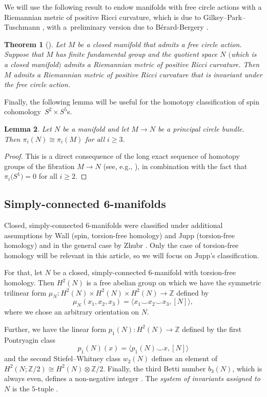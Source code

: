 \documentclass[10pt,a4paper]{amsart}
\numberwithin{equation}{section}
\newtheorem{Theorem}{Theorem}[section]
\newtheorem{Lemma}[Theorem]{Lemma}
\theoremstyle{definition}
\numberwithin{table}{section}
\newcommand{\Z}{\mathbb{Z}}
\begin{document}
We will use the following result to endow manifolds with free circle actions with a Riemannian metric of positive Ricci curvature, which is due to Gilkey--Park--Tuschmann \cite{GPT98}, with a~preliminary version due to B\'erard-Bergery \cite{BB78}.
\begin{Theorem}[{\cite{BB78,GPT98}}]\label{T:Ric>0_bdl}
	Let $M$ be a closed manifold that admits a free circle action. Suppose that $M$ has finite fundamental group and the quotient space $N$ $($which is a closed manifold$)$ admits a Riemannian metric of positive Ricci curvature. Then $M$ admits a Riemannian metric of positive Ricci curvature that is invariant under the free circle action.
\end{Theorem}

Finally, the following lemma will be useful for the homotopy classification of spin cohomology~${S^2\times S^5}$s.
\begin{Lemma}\label{L:princ_circ_hom}
	Let $N$ be a manifold and let $M\to N$ be a principal circle bundle. Then $\pi_i(N)\cong\pi_i(M)$ for all $i\geq 3$.
\end{Lemma}
\begin{proof}
	This is a direct consequence of the long exact sequence of homotopy groups of the fibration $M\to N$ (see, e.g., \cite[Corollary 6.44]{DK01}), in combination with the fact that $\pi_i\bigl(S^1\bigr)=0$ for all $i\geq 2$.
\end{proof}

\subsection{Simply-connected 6-manifolds}

Closed, simply-connected $6$-manifolds were classified under additional assumptions by Wall \mbox{\cite{Wa66,Wa67}} (spin, torsion-free homology) and Jupp \cite{Ju73} (torsion-free homology) and in the general case by Zhubr \cite{Zu75,Zh00}. Only the case of torsion-free homology will be relevant in this article, so we will focus on Jupp's classification.

For that, let $N$ be a closed, simply-connected $6$-manifold with torsion-free homology. Then $H^2(N)$ is a free abelian group on which we have the symmetric trilinear form $\mu_N\colon H^2(N)\times H^2(N)\times H^2(N)\to \Z$ defined by
\[ \mu_N(x_1,x_2,x_3)=\langle x_1\smile x_2\smile x_3,[N]\rangle, \]
where we chose an arbitrary orientation on $N$.

Further, we have the linear form $p_1(N)\colon H^2(N)\to \Z$ defined by the first Pontryagin class
\[ p_1(N)(x)=\langle p_1(N)\smile x,[N]\rangle \]
and the second Stiefel--Whitney class $w_2(N)$ defines an element of $H^2(N;\Z/2)\cong H^2(N)\otimes\Z/2$. Finally, the third Betti number $b_3(N)$, which is always even, defines a non-negative integer .	The \emph{system of invariants assigned to $N$} is the $5$-tuple .
\end{document}
